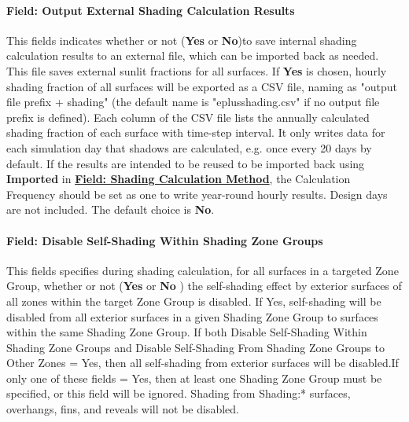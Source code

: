 \paragraph{Field: Output External Shading Calculation Results}\label{field-output-external-shading-calculation-results}
This fields indicates whether or not (\textbf{Yes} or \textbf{No})to save internal shading calculation results to an external file, which can be imported back as needed. This file saves external sunlit fractions for all surfaces. If \textbf{Yes} is chosen, hourly shading fraction of all surfaces will be exported as a CSV file, naming as "output file prefix + shading" (the default name is "eplusshading.csv" if no output file prefix is defined). Each column of the CSV file lists the annually calculated shading fraction of each surface with time-step interval. It only writes data for each simulation day that shadows are calculated, e.g. once every 20 days by default. If the results are intended to be reused to be imported back using \textbf{Imported} in \textbf{\hyperref[field-shading-calculation-method]{Field: Shading Calculation Method}}, the Calculation Frequency should be set as one to write year-round hourly results. Design days are not included. The default choice is \textbf{No}.

\paragraph{Field: Disable Self-Shading Within Shading Zone Groups}\label{field-self--disable-shading-within-a-zone-group}
This fields specifies during shading calculation, for all surfaces in a targeted Zone Group, whether or not (\textbf{Yes} or \textbf{No} ) the self-shading effect by exterior surfaces of all zones within the target Zone Group is disabled. If Yes, self-shading will be disabled from all exterior surfaces in a given Shading Zone Group to surfaces within the same Shading Zone Group. If both Disable Self-Shading Within Shading Zone Groups and Disable Self-Shading From Shading Zone Groups to Other Zones = Yes, then all self-shading from exterior surfaces will be disabled.If only one of these fields = Yes, then at least one Shading Zone Group must be specified, or this field will be ignored. Shading from Shading:* surfaces, overhangs, fins, and reveals will not be disabled.

